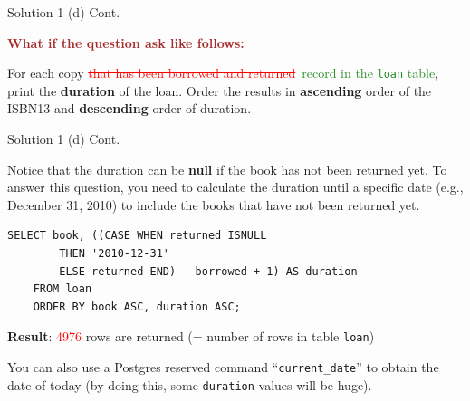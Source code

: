 \begin{frame}[fragile]{Solution 1 (d) Cont.}

\textcolor{brown}{\textbf{What if the question ask like follows:}} \\ \vspace{5pt}

For each copy \textcolor{red}{\st{that has been borrowed and returned}}~\textcolor{ForestGreen}{record in the \texttt{loan} table}, print the \textbf{duration} of the loan. Order the results in \textbf{ascending} order of the ISBN13 and \textbf{descending} order of duration.  \\ \vspace{15pt}
	
\end{frame}

\begin{frame}[fragile]{Solution 1 (d) Cont.}
	
Notice that the duration can be \textbf{null} if the book has not been returned yet. To answer this question, you need to calculate the duration until a specific date (e.g., December 31, 2010) to include the books that have not been returned yet. \vspace{10pt}
	
\begin{lstlisting}
SELECT book, ((CASE	WHEN returned ISNULL 
		THEN '2010-12-31'
		ELSE returned END) - borrowed + 1) AS duration 
	FROM loan
	ORDER BY book ASC, duration ASC;
\end{lstlisting}
\vspace{10pt}
 
\textbf{Result}: \textcolor{red}{4976} rows are returned (= number of rows in table \texttt{loan})

\begin{exampleblock}{}
	You can also use a Postgres reserved command ``\texttt{current\_date}'' to obtain the date of today (by doing this, some \texttt{duration} values will be huge). 
\end{exampleblock}	
\end{frame}


